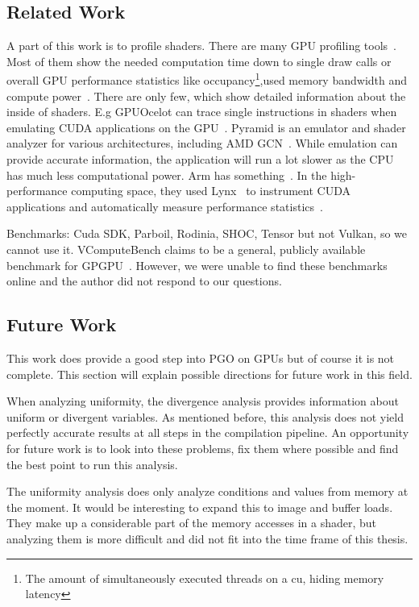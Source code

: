 \subsection{Related Work}
\label{sub:relatedwork}
A part of this work is to profile shaders. There are many GPU profiling tools~\cite{UnityGPUProfiler, UnrealGPUProfiling, MSGPUUsage, PGI2014}.
Most of them show the needed computation time down to single draw calls or overall GPU performance statistics like occupancy\footnote{The amount of simultaneously executed threads on a \gls{cu}, hiding memory latency},used memory bandwidth and compute power~\cite{NvidiaNsight, NvidiaShaderPerf, AMDShaderAnalyzer}.
There are only few, which show detailed information about the inside of shaders. E.g GPUOcelot can trace single instructions in shaders when emulating CUDA applications on the GPU~\cite{GPUOcelot, Lakshminarayana2010}. Pyramid is an emulator and shader analyzer for various architectures, including AMD GCN~\cite{Pyramid}.
While emulation can provide accurate information, the application will run a lot slower as the CPU has much less computational power.
Arm has something~\cite{Barton2013}.
In the high-performance computing space, they used Lynx~\cite{Lynx} to instrument CUDA applications and automatically measure performance statistics~\cite{Farooqui2014}.

Benchmarks: Cuda SDK, Parboil, Rodinia, SHOC, Tensor but not Vulkan, so we cannot use it. VComputeBench claims to be a general, publicly available benchmark for GPGPU~\cite{Mammeri2018}. However, we were unable to find these benchmarks online and the author did not respond to our questions.

\subsection{Future Work}
\label{sub:futurework}
This work does provide a good step into PGO on GPUs but of course it is not complete.
This section will explain possible directions for future work in this field.

When analyzing uniformity, the divergence analysis provides information about uniform or divergent variables.
As mentioned before, this analysis does not yield perfectly accurate results at all steps in the compilation pipeline.
An opportunity for future work is to look into these problems, fix them where possible and find the best point to run this analysis.

The uniformity analysis does only analyze conditions and values from memory at the moment.
It would be interesting to expand this to image and buffer loads.
They make up a considerable part of the memory accesses in a shader, but analyzing them is more difficult and did not fit into the time frame of this thesis.

